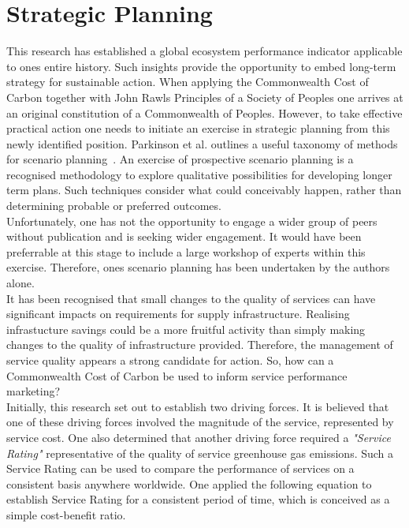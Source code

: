 \documentclass[11pt, oneside]{article}   	%
\begin{document}
\section{Strategic Planning}

This research has established a global ecosystem performance indicator applicable to ones entire history.
Such insights provide the opportunity to embed long-term strategy for sustainable action.
When applying the Commonwealth Cost of Carbon together with John Rawls Principles of a Society of Peoples one arrives at an original constitution of a Commonwealth of Peoples.
However, to take effective practical action one needs to initiate an exercise in strategic planning from this newly identified position.
Parkinson et al. outlines a useful taxonomy of methods for scenario planning~\cite{atp1}.
An exercise of prospective scenario planning is a recognised methodology to explore qualitative possibilities for developing longer term plans.
Such techniques consider what could conceivably happen, rather than determining probable or preferred outcomes.\\

Unfortunately, one has not the opportunity to engage a wider group of peers without publication and is seeking wider engagement.
It would have been preferrable at this stage to include a large workshop of experts within this exercise.
Therefore, ones scenario planning has been undertaken by the authors alone.\\

It has been recognised that small changes to the quality of services can have significant impacts on requirements for supply infrastructure.
Realising infrastucture savings could be a more fruitful activity than simply making changes to the quality of infrastructure provided.
Therefore, the management of service quality appears a strong candidate for action.
So, how can a Commonwealth Cost of Carbon be used to inform service performance marketing?\\

Initially, this research set out to establish two driving forces.
It is believed that one of these driving forces involved the magnitude of the service, represented by service cost.
One also determined that another driving force required a \emph{"Service Rating"} representative of the quality of service greenhouse gas emissions.
Such a Service Rating can be used to compare the performance of services on a consistent basis anywhere worldwide.
One applied the following equation to establish Service Rating for a consistent period of time, which is conceived as a simple cost-benefit ratio.\\
\end{document}
